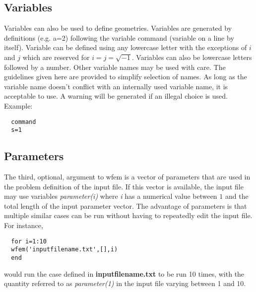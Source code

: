 \documentclass[12pt]{article}
\newcommand*{\command}[1]{\textsf{#1}}
\newcommand*{\variable}[1]{\textit{#1}}
\newcommand*{\filename}[1]{\textsf{\textbf{#1}}}
\begin{document}
\subsection{Variables}
Variables can also be used to define geometries.
Variables are generated by definitions (e.g. \command{a=2}) following
the variable command (\command{variable} on a line by itself).
Variable can be defined using any lowercase letter with the
exceptions of $i$ and $j$ which are reserved for $i=j=\sqrt{-1}$.
Variables can also be lowercase letters followed by a number. Other
variable names may be used with care. The guidelines given here are
provided to simplify selection of names. As long as the variable name
doesn't conflict with an internally used variable name, it is
acceptable to use. A warning will be generated if an illegal choice is
used.
\\Example:\\
\begin{lstlisting}
  command
  s=1
\end{lstlisting}

\subsection{Parameters}
The third, optional, argument to \command{wfem} is a vector of parameters that are used in the problem definition of the input file. If this vector is available, the input file may use variables \variable{parameter(i)} where \variable{i} has a numerical value between $1$ and the total length of the input parameter vector. The advantage of parameters is that multiple similar cases can be run without having to repeatedly edit the input file. For instance, 
\begin{lstlisting}
  for i=1:10
  wfem('inputfilename.txt',[],i)
  end
\end{lstlisting}
would run the case defined in \filename{inputfilename.txt} to be run 10 times, with the quantity referred to as \variable{parameter(1)} in the input file varying between 1 and 10.
\end{document}
